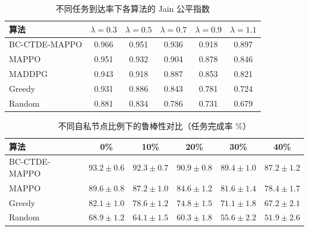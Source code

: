 \begin{table}[htbp]
\centering
\caption{不同任务到达率下各算法的 Jain 公平指数}
\label{tab:ch3_load_perf}
\begin{tabular}{lccccc}
\toprule
算法 & $\lambda=0.3$ & $\lambda=0.5$ & $\lambda=0.7$ & $\lambda=0.9$ & $\lambda=1.1$ \\
\midrule
BC-CTDE-MAPPO & 0.966 & 0.951 & 0.936 & 0.918 & 0.897 \\
MAPPO & 0.951 & 0.932 & 0.904 & 0.878 & 0.846 \\
MADDPG & 0.943 & 0.918 & 0.887 & 0.853 & 0.821 \\
Greedy & 0.931 & 0.886 & 0.843 & 0.781 & 0.724 \\
Random & 0.881 & 0.834 & 0.786 & 0.731 & 0.679 \\
\bottomrule
\end{tabular}
\end{table}

\begin{table}[htbp]
\centering
\caption{不同自私节点比例下的鲁棒性对比（任务完成率 \%）}
\label{tab:ch3_robustness}
\begin{tabular}{lccccc}
\toprule
算法 & 0\% & 10\% & 20\% & 30\% & 40\% \\
\midrule
BC-CTDE-MAPPO & $93.2\pm0.6$ & $92.3\pm0.7$ & $90.9\pm0.8$ & $89.4\pm1.0$ & $87.2\pm1.2$ \\
MAPPO & $89.6\pm0.8$ & $87.2\pm1.0$ & $84.6\pm1.2$ & $81.6\pm1.4$ & $78.4\pm1.7$ \\
Greedy & $82.1\pm1.0$ & $78.6\pm1.2$ & $74.8\pm1.5$ & $71.1\pm1.8$ & $67.2\pm2.1$ \\
Random & $68.9\pm1.2$ & $64.1\pm1.5$ & $60.3\pm1.8$ & $55.6\pm2.2$ & $51.9\pm2.6$ \\
\bottomrule
\end{tabular}
\end{table}

\begin{table}[htbp]
\centering
\caption{消融实验结果（$\lambda=0.9$）}
\label{tab:ch3_ablation}
\end{table}
